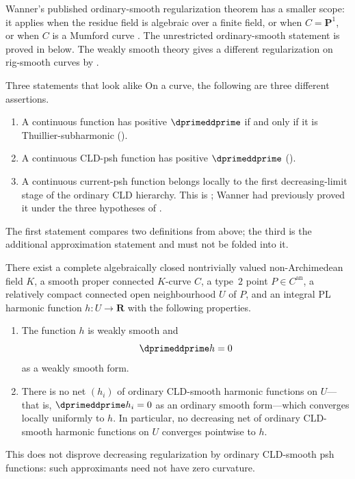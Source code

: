 Wanner's published ordinary-smooth regularization theorem has a smaller
scope: it applies when the residue field is algebraic over a finite field,
or when $C=\mathbf P^1$, or when $C$ is a Mumford curve
\cite[Corollary~5.4]{Wanner19}.  The unrestricted ordinary-smooth statement
is proved in  below.  The
weakly smooth theory gives a different regularization on rig-smooth curves
by \cite[Proposition~15.11]{GJR26}.

\begin{warning}{Three statements that look alike}
On a curve, the following are three different assertions.
\begin{enumerate}
\item A continuous function has positive $\dprimeddprime$ if and only if
 it is Thuillier-subharmonic ().
\item A continuous CLD-psh function has positive $\dprimeddprime$
 ().
\item A continuous current-psh function belongs locally to the first
 decreasing-limit stage of the ordinary CLD hierarchy.  This is
 ; Wanner had previously
 proved it under the three hypotheses of \cite[Corollary~5.4]{Wanner19}.
\end{enumerate}
The first statement compares two definitions from above; the third is the
additional approximation statement and must not be folded into it.
\end{warning}

\begin{proposition}
\label{prop:ch19-cld-smooth-harmonic-nonregularization}
There exist a complete algebraically closed nontrivially valued
non-Archimedean field $K$, a smooth proper connected $K$-curve $C$, a
type~$2$ point $P\in C^{\mathrm{an}}$, a relatively compact connected open
neighbourhood $U$ of $P$, and an integral PL harmonic function
$h:U\to\mathbf R$ with the following properties.
\begin{enumerate}
\item The function $h$ is weakly smooth and
\[
                         \dprimeddprime h=0
\]
as a weakly smooth form.
\item There is no net $(h_i)$ of ordinary CLD-smooth harmonic functions on
$U$---that is, $\dprimeddprime h_i=0$ as an ordinary smooth form---which
converges locally uniformly to $h$.  In particular, no decreasing net of
ordinary CLD-smooth harmonic functions on $U$ converges pointwise to $h$.
\end{enumerate}
This does not disprove decreasing regularization by ordinary CLD-smooth psh
functions: such approximants need not have zero curvature.
\end{proposition}

